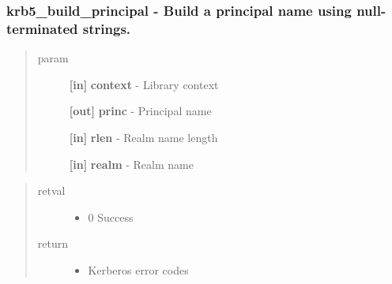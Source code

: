 \documentclass[letterpaper,10pt,english]{sphinxmanual}
\begin{document}
\subsubsection{krb5\_build\_principal -  Build a principal name using null-terminated strings.}
\label{appdev/refs/api/krb5_build_principal:krb5-build-principal-build-a-principal-name-using-null-terminated-strings}\label{appdev/refs/api/krb5_build_principal::doc}

\begin{fulllineitems}
\label{appdev/refs/api/krb5_build_principal:c.krb5_build_principal}
\end{fulllineitems}

\begin{quote}\begin{description}
\item[{param}] \leavevmode
\textbf{{[}in{]}} \textbf{context} - Library context

\textbf{{[}out{]}} \textbf{princ} - Principal name

\textbf{{[}in{]}} \textbf{rlen} - Realm name length

\textbf{{[}in{]}} \textbf{realm} - Realm name

\end{description}\end{quote}
\begin{quote}\begin{description}
\item[{retval}] \leavevmode\begin{itemize}
\item {} 
0   Success

\end{itemize}

\item[{return}] \leavevmode\begin{itemize}
\item {} 
Kerberos error codes

\end{itemize}

\end{description}\end{quote}
\end{document}
